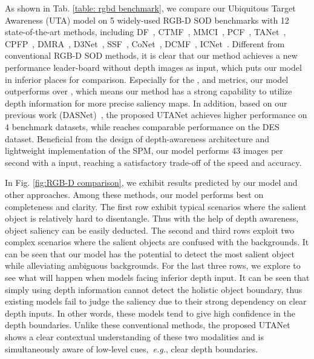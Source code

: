\documentclass[journal]{IEEEtran}
\def\eg{{\em e.g.}}
\newcommand{\figref}[1]{Fig. \ref{#1}}
\newcommand{\tabref}[1]{Tab. \ref{#1}}
\begin{document}
 As shown in \tabref{table: rgbd benchmark}, we compare our Ubiquitous Target Awareness (UTA) model on 5 widely-used RGB-D SOD benchmarks with 12 state-of-the-art methods, including DF~\cite{qu2017rgbd}, CTMF~\cite{han2017cnns}, MMCI~\cite{chen2019multi}, PCF~\cite{chen2018progressively}, TANet~\cite{chen2019three}, CPFP~\cite{zhao2019contrast}, DMRA~\cite{piao2019depth}, D3Net~\cite{fan2019D3Net}, SSF~\cite{zhang2020select}, CoNet~\cite{Wei2020ECCV}, DCMF~\cite{chen2020rgbd}, ICNet~\cite{li2020icnet}.
 Different from conventional RGB-D SOD methods, it is clear that our method achieves a new performance leader-board without depth images as input, which puts our model in inferior places for comparison.
Especially for the ,  and  metrics, our model outperforms over , which means our method has a strong capability to utilize depth information for more precise saliency maps.
In addition, based on our previous work (DASNet)~\cite{oursMM}, the proposed UTANet achieves higher performance on 4 benchmark datasets, while reaches comparable performance on the DES dataset. Beneficial from the design of depth-awareness architecture and lightweight implementation of the SPM, our model performs 43 images per second with a  input, reaching a satisfactory trade-off of the speed and accuracy.



In \figref{fig:RGB-D comparison}, we exhibit results predicted by our model and other approaches. Among these methods, our model performs best on completeness and clarity. The first row exhibit typical scenarios where the salient object is relatively hard to disentangle. Thus with the help of depth awareness, object saliency can be easily deducted.
The second and third rows exploit two complex scenarios where the salient objects are confused with the backgrounds. It can be seen that our model has the potential to detect the most salient object while alleviating ambiguous backgrounds.
For the last three rows, we explore to see what will happen when models facing inferior depth input. It can be seen that simply using depth information cannot detect the holistic object boundary, thus existing models fail to judge the saliency due to their strong dependency on clear depth inputs. In other words, these models tend to give high confidence in the depth boundaries. Unlike these conventional methods, the proposed UTANet shows a clear contextual understanding of these two modalities and is simultaneously aware of low-level cues,~\eg, clear depth boundaries.
\end{document}
